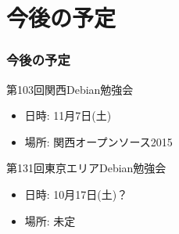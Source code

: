 \documentclass[cjk,dvipdfmx,10pt,compress,%
hyperref={bookmarks=true,bookmarksnumbered=true,bookmarksopen=false,%
colorlinks=false,%
pdftitle={第 102 回 関西 Debian 勉強会},%
pdfauthor={倉敷・のがた・佐々木・かわだ},%
pdfsubject={資料},%
}]{beamer}
\begin{document}
\section{今後の予定}
\begin{frame}[fragile]
\frametitle{今後の予定}

\begin{block}{第103回関西Debian勉強会}
  \begin{itemize}
  \item 日時: 11月7日(土)
  \item 場所: 関西オープンソース2015
  \end{itemize}
\end{block}

\begin{block}{第131回東京エリアDebian勉強会}
  \begin{itemize}
  \item 日時: 10月17日(土)？
  \item 場所: 未定
  \end{itemize}
\end{block}

\end{frame}

\takahashi[50]{  }
\end{document}
